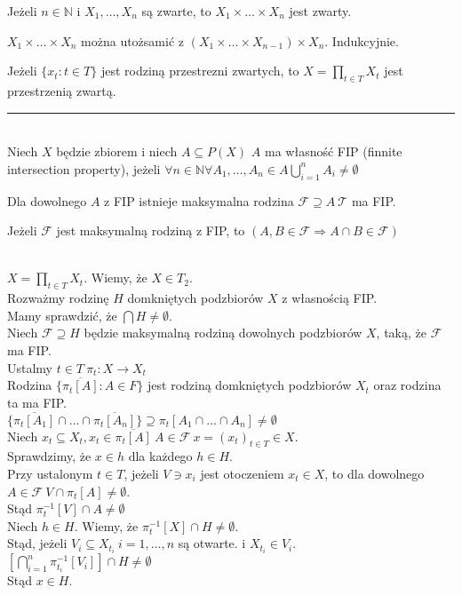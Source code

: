 \begin{wn} Jeżeli $n \in \mathbb N$ i $X_1,\ldots,X_n$ są zwarte, to $X_1 \times \ldots \times X_n$ jest zwarty. \end{wn} 
\begin{dd} $X_1 \times \ldots \times X_n$ można utożsamić z $(X_1 \times \ldots \times X_{n-1}) \times X_n$. Indukcyjnie. \end{dd} 
\begin{tw}[Tichonowa]
    Jeżeli $\{ x_t : t \in T \}$ jest rodziną przestrezni zwartych, to $X = \prod\limits_{t \in T} X_t$ jest przestrzenią zwartą. \\ 
    \rule{2cm}{0.4pt} \\ 
    Niech $X$ będzie zbiorem i niech $A \subseteq P(X)$ $A$ ma własność FIP (finnite intersection property), jeżeli $\forall n \in \mathbb N 
    \forall A_1,\ldots,A_n \in A \bigcup\limits_{i=1}^n A_i \neq \emptyset$
\end{tw} 
\begin{ft} 
    Dla dowolnego $A$ z FIP istnieje maksymalna rodzina $\mathcal F \supseteq A \ \mathcal T$ ma FIP.
\end{ft} 
\begin{wn} Jeżeli $\mathcal F$ jest maksymalną rodziną z FIP, to $(A,B \in \mathcal F \Rightarrow A \cap B \in \mathcal F)$ \end{wn} 
\begin{dd} ~\\ 
    $X = \prod\limits_{t \in T} X_t$. Wiemy, że $X \in T_2$. \\ 
    Rozważmy rodzinę $H$ domkniętych podzbiorów $X$ z własnością FIP. \\ 
    Mamy sprawdzić, że $\bigcap H \neq \emptyset$. \\ 
    Niech $\mathcal F \supseteq H$ będzie maksymalną rodziną dowolnych podzbiorów $X$, taką, że $\mathcal F$ ma FIP. \\ 
    Ustalmy $t \in T \ \pi_t: X \to X_t$ \\ 
    Rodzina $\{\overline{\pi_t [A]} : A \in F \}$ jest rodziną domkniętych podzbiorów $X_t$ oraz rodzina ta ma FIP. \\ 
    $\{ \overline{\pi_t [A_1]} \cap \ldots \cap \overline{\pi_t [A_n]}\} \supseteq \pi_t[A_1 \cap \ldots \cap A_n] \neq \emptyset$ \\
    Niech $x_t \subseteq X_t, x_t \in \overline{\pi_t [A]} \ A \in \mathcal F \ x = (x_t)_{t \in T} \in X$. \\ 
    Sprawdzimy, że $x \in h$ dla każdego $h \in H$. \\ 
    Przy ustalonym $t \in T$, jeżeli $V \ni x_i$ jest otoczeniem $x_t \in X$, to dla dowolnego $A \in \mathcal F \ V \cap \pi_t [A] \neq \emptyset$. \\ 
    Stąd $\pi_t^{-1} [V] \cap A \neq \emptyset$ \\ 
    Niech $h \in H$. Wiemy, że $\pi_t ^{-1} [X] \cap H \neq \emptyset$. \\ 
    Stąd, jeżeli $V_i \subseteq X_{t_i} \ i = 1,\ldots,n$ są otwarte. i $X_{t_i} \in V_i$. \\ 
    $[ \bigcap\limits_{i=1}^n \pi_{t_i}^{-1} [V_i] ] \cap H \neq \emptyset$ \\ 
    Stąd $x \in H$. 
\end{dd} 
